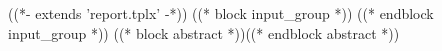 ((*- extends 'report.tplx' -*))
((* block input_group *))
((* endblock input_group *))
((* block abstract *))\tableofcontents((* endblock abstract *))
